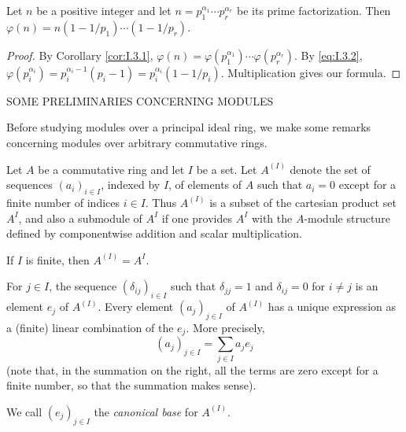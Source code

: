 \begin{corollary}
\label{cor:I.3.2}
Let $n$ be a positive integer and let
$n=p_{1}^{\alpha_{1}}\cdots p_{r}^{\alpha_{r}}$ be its prime factorization.
Then $\varphi(n)=n(1-1/p_{1})\cdots(1-1/p_{r})$.
\end{corollary}

\begin{proof}
By Corollary \ref{cor:I.3.1},
$\varphi(n)=\varphi(p_{1}^{\alpha_{1}})\cdots
\varphi(p_{r}^{\alpha_{r}})$. By \eqref{eq:I.3.2},
$\varphi(p_{i}^{\alpha_{i}})=p_{i}^{\alpha_{i}-1}(p_{i}-1)
=p_{i}^{\alpha_{i}}(1-1/p_{i})$. Multiplication gives our formula.
\end{proof}

%
        {SOME PRELIMINARIES CONCERNING MODULES}

Before studying modules over a principal ideal ring, we make some remarks
concerning modules over arbitrary commutative rings.

Let $A$ be a commutative ring and let $I$ be a set. Let $A^{(I)}$ denote the
set of sequences $(a_{i})_{i\in I}$, indexed by $I$, of elements of $A$ such
that $a_{i}=0$ except for a finite number of indices $i\in I$. Thus
$A^{(I)}$ is a subset of the cartesian product set $A^{I}$, and also a
submodule of $A^{I}$ if one provides $A^{I}$ with the $A$-module structure
defined by componentwise addition and scalar multiplication.

If $I$ is finite, then $A^{(I)}=A^{I}$.

For $j\in I$, the sequence $(\delta_{ij})_{i\in I}$ such that
$\delta_{jj}=1$ and $\delta_{ij}=0$ for $i\neq j$ is an element $e_{j}$ of
$A^{(I)}$. Every element $(a_{j})_{j\in I}$ of $A^{(I)}$ has a unique
expression as a (finite) linear combination of the $e_{j}$. More precisely,
\begin{equation}
(a_{j})_{j\in I}=\sum_{j\in I}a_{j}e_{j}
\label{eq:I.4.1}
\end{equation}
(note that, in the summation on the right, all the terms are zero except for
a finite number, so that the summation makes sense).

We call $(e_{j})_{j\in I}$ the \emph{canonical base} for $A^{(I)}$.

